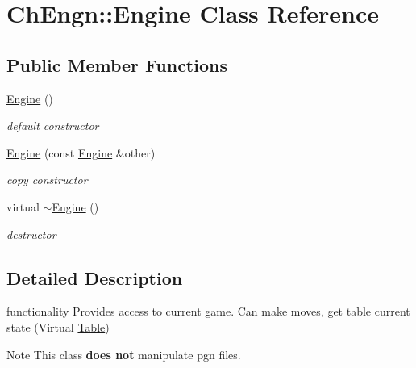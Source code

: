 \hypertarget{classChEngn_1_1Engine}{
\section{ChEngn::Engine Class Reference}
\label{classChEngn_1_1Engine}
}
\subsection*{Public Member Functions}
\begin{DoxyCompactItemize}
\item 
\hypertarget{classChEngn_1_1Engine_a2bd4b075e86d94d94f3ea97c680b302e}{
\hyperlink{classChEngn_1_1Engine_a2bd4b075e86d94d94f3ea97c680b302e}{Engine} ()}
\label{classChEngn_1_1Engine_a2bd4b075e86d94d94f3ea97c680b302e}

\begin{DoxyCompactList}\small\item\em default constructor \item\end{DoxyCompactList}\item 
\hyperlink{classChEngn_1_1Engine_ab92c015fc819dc2b7c51cccbc7878002}{Engine} (const \hyperlink{classChEngn_1_1Engine}{Engine} \&other)
\begin{DoxyCompactList}\small\item\em copy constructor \item\end{DoxyCompactList}\item 
\hypertarget{classChEngn_1_1Engine_a8c4cadb1d68d9f3f9ad5ca03d3353a34}{
virtual \hyperlink{classChEngn_1_1Engine_a8c4cadb1d68d9f3f9ad5ca03d3353a34}{$\sim$Engine} ()}
\label{classChEngn_1_1Engine_a8c4cadb1d68d9f3f9ad5ca03d3353a34}

\begin{DoxyCompactList}\small\item\em destructor \item\end{DoxyCompactList}\end{DoxyCompactItemize}


\subsection{Detailed Description}
functionality Provides access to current game. Can make moves, get table current state (Virtual \hyperlink{classChEngn_1_1Table}{Table}) \begin{DoxyNote}{Note}
This class {\bfseries does not} manipulate pgn files. 
\end{DoxyNote}


